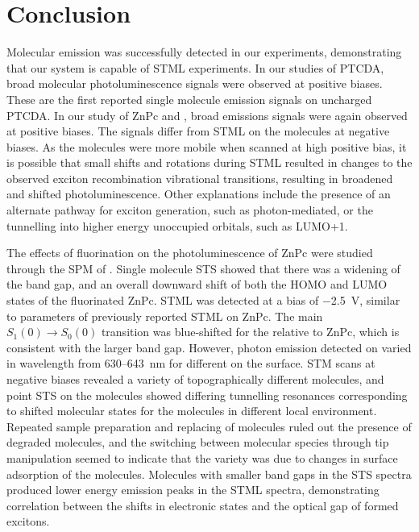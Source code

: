 
\chapter{Conclusion}
\label{ch:conc}


Molecular emission was successfully detected in our experiments, demonstrating that our system is capable of \ac{STML} experiments. In our studies of PTCDA, broad molecular photoluminescence signals were observed at positive biases. These are the first reported single molecule emission signals on uncharged \ac{PTCDA}. In our study of \ac{ZnPc} and , broad emissions signals were again observed at positive biases. The signals differ from \ac{STML} on the molecules at negative biases. As the molecules were more mobile when scanned at high positive bias, it is possible that small shifts and rotations during \ac{STML} resulted in changes to the observed exciton recombination vibrational transitions, resulting in broadened and shifted photoluminescence. Other explanations include the presence of an alternate pathway for exciton generation, such as photon-mediated, or the tunnelling into higher energy unoccupied orbitals, such as LUMO+1. 

The effects of fluorination on the photoluminescence of ZnPc were studied through the \ac{SPM} of . Single molecule \ac{STS} showed that there was a widening of the band gap, and an overall downward shift of both the HOMO and LUMO states of the fluorinated ZnPc. \ac{STML} was detected at a bias of \SI{-2.5}{V}, similar to parameters of previously reported \ac{STML} on ZnPc. The main $S_1(0) \rightarrow S_0(0)$ transition was blue-shifted for the  relative to ZnPc, which is consistent with the larger band gap. However, photon emission detected on  varied in wavelength from 630--\SI{643}{nm} for different  on the surface. \ac{STM} scans at negative biases revealed a variety of topographically different molecules, and point \ac{STS} on the molecules showed differing tunnelling resonances corresponding to shifted molecular states for the molecules in different local environment. Repeated sample preparation and replacing of molecules ruled out the presence of degraded molecules, and the switching between molecular species through tip manipulation seemed to indicate that the variety was due to changes in surface adsorption of the molecules. Molecules with smaller band gaps in the \ac{STS} spectra produced lower energy emission peaks in the \ac{STML} spectra, demonstrating correlation between the shifts in electronic states and the optical gap of formed excitons.

